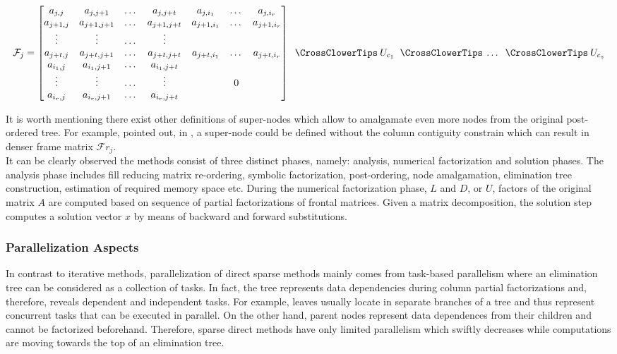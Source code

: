  \begin{equation} \label{eq:mm-10}
	\mathcal{F}_{j} = \begin{bmatrix}a_{j,j} & a_{j,j+1} & \dots & a_{j,j+t}  & a_{j,i_1} & \dots & a_{j,i_r} \\
a_{j+1,j} & a_{j+1,j+1} & \dots & a_{j+1,j+t}  & a_{j+1,i_1} & \dots & a_{j+1,i_r} \\
\vdots & \vdots & \dots & \vdots \\
a_{j+t,j}  & a_{j+t,j+1} & \dots & a_{j+t,j+t}  & a_{j+t,i_1} & \dots & a_{j+t,i_r} \\
a_{i_1,j} & a_{i_1,j+1} & \dots & a_{i_1,j+t} \\
\vdots & \vdots & \dots & \vdots  & & 0\\ 
a_{i_r,j} & a_{i_r,j+1} & \dots & a_{i_r,j+t} \\
\end{bmatrix} \extendadd U_{c_1} \extendadd \dots \extendadd U_{c_s} 
\end{equation}


It is worth mentioning there exist other definitions of super-nodes which allow to amalgamate even more nodes from the original post-ordered tree. For example, \citeauthor{mult-frontal-original:2} pointed out, in \cite{mult-frontal-original:2}, a super-node could be defined without the column contiguity constrain which can result in denser frame matrix $\mathcal{F}r_{j}$.\\


It can be clearly observed the methods consist of three distinct phases, namely: analysis, numerical factorization and solution phases. The analysis phase includes fill reducing matrix re-ordering, symbolic factorization, post-ordering, node amalgamation, elimination tree construction, estimation of required memory space etc. During the numerical factorization phase, $L$ and $D$, or $U$, factors of the original matrix $A$ are computed based on sequence of partial factorizations of frontal matrices. Given a matrix decomposition, the solution step computes a solution vector $x$ by means of backward and forward substitutions.\\



\subsubsection{Parallelization Aspects}
\label{subseq:direct-parallel-aspects}


In contrast to iterative methods, parallelization of direct sparse methods mainly comes from task-based parallelism where an elimination tree can be considered as a collection of tasks. In fact, the tree represents data dependencies during column partial factorizations and, therefore, reveals dependent and independent tasks. For example, leaves usually locate in separate branches of a tree and thus represent concurrent tasks that can be executed in parallel. On the other hand, parent nodes represent data dependences from their children and cannot be factorized beforehand. Therefore, sparse direct methods have only limited parallelism which swiftly decreases while computations are moving towards the top of an elimination tree.\\


